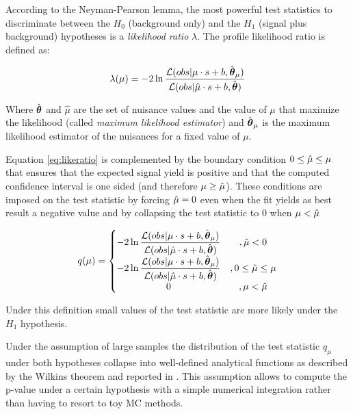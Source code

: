 
According to the Neyman-Pearson lemma, the most powerful test statistics to discriminate between the $H_0$ (background only) and the $H_1$ (signal plus background) hypotheses is a \emph{likelihood ratio} $\lambda$. The profile likelihood ratio is defined as:

\begin{equation}
\label{eq:likeratio}
\lambda(\mu) = -2 \operatorname{ln} \dfrac{\mathcal{L}(obs | \mu \cdot s + b, \hat{\boldsymbol\theta}_\mu)}{\mathcal{L}(obs | \hat{\mu} \cdot s + b, \hat{\boldsymbol\theta})}
\end{equation}

Where $\hat{\boldsymbol\theta}$ and $\hat{\mu}$ are the set of nuisance values and the value of $\mu$ that maximize the likelihood (called \emph{maximum likelihood estimator}) and $\hat{\boldsymbol\theta}_\mu$ is the maximum likelihood estimator of the nuisances for a fixed value of $\mu$.

Equation \ref{eq:likeratio} is complemented by the boundary condition $0 \leq \hat{\mu} \leq \mu$ that ensures that the expected signal yield is positive and that the computed confidence interval is one sided (and therefore $\mu \geq \hat{\mu}$). These conditions are imposed on the test statistic by forcing $\hat{\mu} = 0$ even when the fit yields as best result a negative value and by collapsing the test statistic to 0 when $\mu < \hat{\mu}$

\begin{equation}
q(\mu) = \left\{\begin{matrix}
-2 \operatorname{ln} \dfrac{\mathcal{L}(obs | \mu \cdot s + b, \hat{\boldsymbol\theta}_\mu)}{\mathcal{L}(obs | \hat{\mu} \cdot s + b, \hat{\boldsymbol\theta})} & , \hat{\mu} < 0\\ 
-2 \operatorname{ln} \dfrac{\mathcal{L}(obs | \mu \cdot s + b, \hat{\boldsymbol\theta}_\mu)}{\mathcal{L}(obs | \hat{\mu} \cdot s + b, \hat{\boldsymbol\theta})} & ,0 \leq \hat{\mu} \leq \mu \\ 
0 & , \mu < \hat{\mu}
\end{matrix}\right.
\end{equation}

Under this definition small values of the test statistic are more likely under the $H_1$ hypothesis.

Under the assumption of large samples the distribution of the test statistic $q_\mu$ under both hypotheses collapse into well-defined analytical functions as described by the Wilkins theorem and reported in \cite{Cowan:2010js, higgscombo}. This assumption allows to compute the p-value under a certain hypothesis with a simple numerical integration rather than having to resort to toy MC methods.


